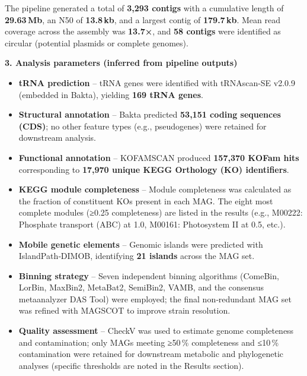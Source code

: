 \documentclass[
  11pt,
]{article}
\providecommand{\tightlist}{%
  \setlength{\itemsep}{0pt}\setlength{\parskip}{0pt}}
\begin{document}
The pipeline generated a total of \textbf{3,293 contigs} with a
cumulative length of \textbf{29.63\,Mb}, an N50 of \textbf{13.8\,kb},
and a largest contig of \textbf{179.7\,kb}. Mean read coverage across
the assembly was \textbf{13.7×}, and \textbf{58 contigs} were identified
as circular (potential plasmids or complete genomes).

\textbf{3. Analysis parameters (inferred from pipeline outputs)}

\begin{itemize}
\tightlist
\item
  \textbf{tRNA prediction} -- tRNA genes were identified with
  tRNAscan-SE v2.0.9 (embedded in Bakta), yielding \textbf{169 tRNA
  genes}.\\
\item
  \textbf{Structural annotation} -- Bakta predicted \textbf{53,151
  coding sequences (CDS)}; no other feature types (e.g., pseudogenes)
  were retained for downstream analysis.\\
\item
  \textbf{Functional annotation} -- KOFAMSCAN produced \textbf{157,370
  KOFam hits} corresponding to \textbf{17,970 unique KEGG Orthology (KO)
  identifiers}.\\
\item
  \textbf{KEGG module completeness} -- Module completeness was
  calculated as the fraction of constituent KOs present in each MAG. The
  eight most complete modules (≥0.25 completeness) are listed in the
  results (e.g., M00222: Phosphate transport (ABC) at 1.0, M00161:
  Photosystem II at 0.5, etc.).\\
\item
  \textbf{Mobile genetic elements} -- Genomic islands were predicted
  with IslandPath‑DIMOB, identifying \textbf{21 islands} across the MAG
  set.\\
\item
  \textbf{Binning strategy} -- Seven independent binning algorithms
  (ComeBin, LorBin, MaxBin2, MetaBat2, SemiBin2, VAMB, and the consensus
  metaanalyzer DAS Tool) were employed; the final non‑redundant MAG set
  was refined with MAGSCOT to improve strain resolution.\\
\item
  \textbf{Quality assessment} -- CheckV was used to estimate genome
  completeness and contamination; only MAGs meeting ≥50\,\% completeness
  and ≤10\,\% contamination were retained for downstream metabolic and
  phylogenetic analyses (specific thresholds are noted in the Results
  section).
\end{itemize}
\end{document}

